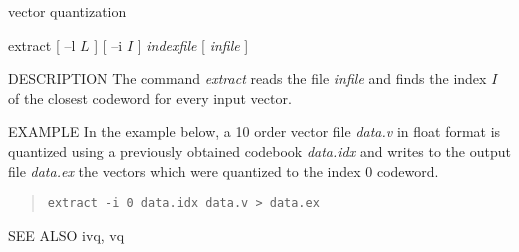 %
{vector quantization}

\begin{synopsis}
\item [extract] [ --l $L$ ] [ --i $I$ ]  {\em indexfile}  [ {\em infile} ] 
\end{synopsis}

\begin{qsection}{DESCRIPTION}
The command {\em extract} reads the file {\em infile}
and finds the index $I$ of the closest codeword for every 
input vector.
\end{qsection}

\begin{options}
\end{options}

\begin{qsection}{EXAMPLE}
In the example below, a 10 order vector file {\em data.v}
in float format is quantized using a previously obtained
codebook {\em data.idx} and writes to the output file {\em data.ex}
the vectors which were quantized to the index 0 codeword.
\begin{quote}
\verb!extract -i 0 data.idx data.v > data.ex!
\end{quote}
\end{qsection}

\begin{qsection}{SEE ALSO}
ivq, vq
\end{qsection}
